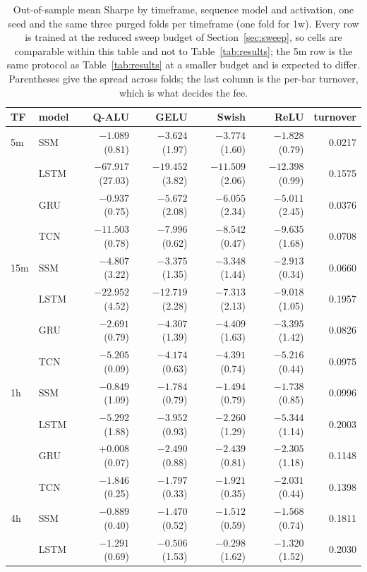 \begin{table}[t]
\centering
\caption{Out-of-sample mean Sharpe by timeframe, sequence model and
activation, one seed and the same three purged folds per timeframe
(one fold for 1w). Every row is trained at the reduced sweep budget of
Section~\ref{sec:sweep}, so cells are comparable within this table and
not to Table~\ref{tab:results}; the 5m row is the same protocol as
Table~\ref{tab:results} at a smaller budget and is expected to differ.
Parentheses give the spread across folds; the last column is the
per-bar turnover, which is what decides the fee.}
\label{tab:sweep}
\footnotesize
\setlength{\tabcolsep}{4pt}
\begin{tabular}{llrrrrr}
\toprule
TF & model & Q-ALU & GELU & Swish & ReLU & turnover \\
\midrule
5m & SSM & $-1.089$ (0.81) & $-3.624$ (1.97) & $-3.774$ (1.60) & $-1.828$ (0.79) & 0.0217 \\
 & LSTM & $-67.917$ (27.03) & $-19.452$ (3.82) & $-11.509$ (2.06) & $-12.398$ (0.99) & 0.1575 \\
 & GRU & $-0.937$ (0.75) & $-5.672$ (2.08) & $-6.055$ (2.34) & $-5.011$ (2.45) & 0.0376 \\
 & TCN & $-11.503$ (0.78) & $-7.996$ (0.62) & $-8.542$ (0.47) & $-9.635$ (1.68) & 0.0708 \\
\midrule
15m & SSM & $-4.807$ (3.22) & $-3.375$ (1.35) & $-3.348$ (1.44) & $-2.913$ (0.34) & 0.0660 \\
 & LSTM & $-22.952$ (4.52) & $-12.719$ (2.28) & $-7.313$ (2.13) & $-9.018$ (1.05) & 0.1957 \\
 & GRU & $-2.691$ (0.79) & $-4.307$ (1.39) & $-4.409$ (1.63) & $-3.395$ (1.42) & 0.0826 \\
 & TCN & $-5.205$ (0.09) & $-4.174$ (0.63) & $-4.391$ (0.74) & $-5.216$ (0.44) & 0.0975 \\
\midrule
1h & SSM & $-0.849$ (1.09) & $-1.784$ (0.79) & $-1.494$ (0.79) & $-1.738$ (0.85) & 0.0996 \\
 & LSTM & $-5.292$ (1.88) & $-3.952$ (0.93) & $-2.260$ (1.29) & $-5.344$ (1.14) & 0.2003 \\
 & GRU & $+0.008$ (0.07) & $-2.490$ (0.88) & $-2.439$ (0.81) & $-2.305$ (1.18) & 0.1148 \\
 & TCN & $-1.846$ (0.25) & $-1.797$ (0.33) & $-1.921$ (0.35) & $-2.031$ (0.44) & 0.1398 \\
\midrule
4h & SSM & $-0.889$ (0.40) & $-1.470$ (0.52) & $-1.512$ (0.59) & $-1.568$ (0.74) & 0.1811 \\
 & LSTM & $-1.291$ (0.69) & $-0.506$ (1.53) & $-0.298$ (1.62) & $-1.320$ (1.52) & 0.2030 \\

\end{tabular}
\end{table}
